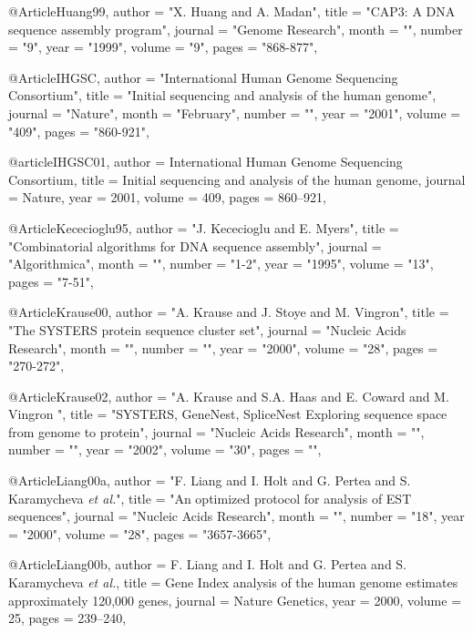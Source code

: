 @Article{Huang99,
   author =   "X. Huang and A. Madan",
   title =   "\uppercase{CAP3}: A \uppercase{DNA} sequence assembly program",
   journal =   "Genome Research",
   month = "",
   number = "9",
   year =   "1999",
   volume =   "9",
   pages =   "868-877",
}

@Article{IHGSC,
   author =   "International Human Genome Sequencing Consortium",
   title =   "Initial sequencing and analysis of the human genome",
   journal =   "Nature",
   month = "February",
   number = "",
   year =   "2001",
   volume =   "409",
   pages =   "860-921",
}

@article{IHGSC01,
author = {International Human Genome Sequencing Consortium},
title = {Initial sequencing and analysis of the human genome},
journal = {Nature},
year = 2001,
volume = {409},
pages = {860--921},
}

@Article{Kececioglu95,
   author =   "J. Kececioglu and E. Myers",
   title =   "Combinatorial algorithms for \uppercase{DNA} sequence assembly",
   journal =   "Algorithmica",
   month = "",
   number = "1-2",
   year =   "1995",
   volume =   "13",
   pages =   "7-51",
}

@Article{Krause00,
   author =   "A. Krause and J. Stoye and M. Vingron",
   title =   "The \uppercase{SYSTERS} protein sequence cluster set",
   journal =   "Nucleic Acids Research",
   month = "",
   number = "",
   year =   "2000",
   volume =   "28",
   pages =   "270-272",
}

@Article{Krause02,
   author =   "A. Krause and S.A. Haas and E. Coward and M. Vingron ",
   title =   "\uppercase{SYSTERS}, \uppercase{G}ene\uppercase{N}est, \uppercase{S}plice\uppercase{N}est \uppercase{E}xploring sequence space from genome to protein",
   journal =   "Nucleic Acids Research",
   month = "",
   number = "",
   year =   "2002",
   volume =   "30",
   pages =   "",
}



@Article{Liang00a,
   author =   "F. Liang and I. Holt and G. Pertea and S. Karamycheva {\it et al.}",
   title =   "An optimized protocol for analysis of \uppercase{EST} sequences",
   journal = "Nucleic Acids Research",
   month = "",
   number = "18",
   year =   "2000",
   volume =   "28",
   pages =   "3657-3665",
}


@Article{Liang00b,
author = {F. Liang and I. Holt and G. Pertea and S. Karamycheva {\it et al.}},
title = {Gene {I}ndex analysis of the human genome estimates approximately 120,000 genes},
journal = {Nature Genetics},
year = 2000,
volume = {25},
pages = {239--240},
}

